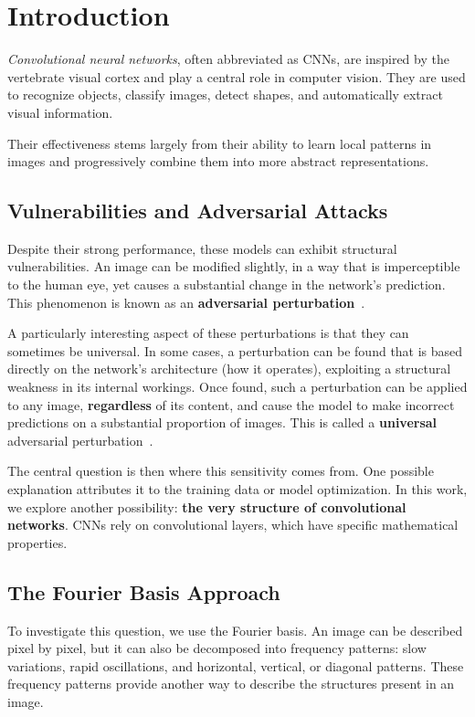 \chapter{Introduction}

\textit{Convolutional neural networks}, often abbreviated as CNNs,
are inspired by the vertebrate visual cortex and play a central role in computer vision.
They are used to recognize objects, classify images, detect shapes, and automatically extract
visual information.

Their effectiveness stems largely from their ability to learn local patterns in
images and progressively combine them into more abstract representations.

\section*{Vulnerabilities and Adversarial Attacks}

Despite their strong performance, these models can exhibit structural vulnerabilities.
An image can be modified slightly, in a way that is imperceptible to the human eye,
yet causes a substantial change in the network's prediction. This phenomenon is known as an
\textbf{adversarial perturbation}~\cite{szegedy2014intriguing}.

A particularly interesting aspect of these perturbations is that they can sometimes be universal. In some cases,
a perturbation can be found that is based directly on the network's architecture
(how it operates), exploiting a structural weakness in its internal workings.
Once found, such a perturbation can be applied to any image,
\textbf{regardless} of its content, and cause the model to make incorrect
predictions on a substantial proportion of images. This is called a \textbf{universal} adversarial perturbation~\cite{moosavi2017universal}.

The central question is then where this sensitivity comes from. One possible explanation
attributes it to the training data or model optimization. In this work, we
explore another possibility: \textbf{the very structure of convolutional networks}. CNNs
rely on convolutional layers, which have specific mathematical properties.

\section*{The Fourier Basis Approach}

To investigate this question, we use the Fourier basis. An image can be
described pixel by pixel, but it can also be decomposed into frequency patterns: slow variations,
rapid oscillations, and horizontal, vertical, or diagonal patterns. These frequency patterns provide
another way to describe the structures present in an image.

